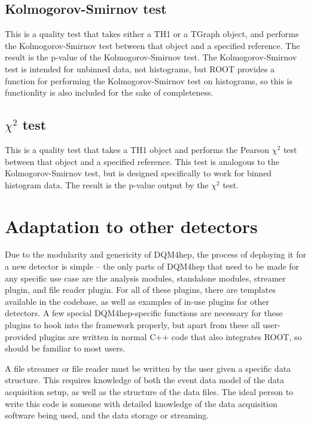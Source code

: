 \subsection{Kolmogorov-Smirnov test}
This is a quality test that takes either a TH1 or a TGraph object, and performs the Kolmogorov-Smirnov test between that object and a specified reference. The result is the p-value of the Kolmogorov-Smirnov test. The Kolmogorov-Smirnov test is intended for unbinned data, not histograms, but ROOT provides a function for performing the Kolmogorov-Smirnov test on histograms, so this is functionlity is also included for the sake of completeness.

\subsection{$\chi^2$ test}
This is a quality test that takes a TH1 object and performs the Pearson $\chi^2$ test between that object and a specified reference. This test is analogous to the Kolmogorov-Smirnov test, but is designed specifically to work for binned histogram data. The result is the p-value output by the $\chi^2$ test. 


\section{Adaptation to other detectors}
Due to the modularity and genericity of DQM4hep, the process of deploying it for a new detector is simple -- the only parts of DQM4hep that need to be made for any specific use case are the analysis modules, standalone modules, streamer plugin, and file reader plugin. For all of these plugins, there are templates available in the codebase, as well as examples of in-use plugins for other detectors. A few special DQM4hep-specific functions are necessary for these plugins to hook into the framework properly, but apart from these all user-provided plugins are written in normal C++ code that also integrates ROOT, so should be familiar to most users.

A file streamer or file reader must be written by the user given a specific data structure. This requires knowledge of both the event data model of the data acquisition setup, as well as the structure of the data files. The ideal person to write this code is someone with detailed knowledge of the data acquisition software being used, and the data storage or streaming. 

